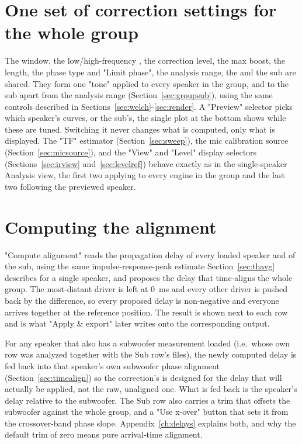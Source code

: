 \section{One set of correction settings for the whole group}
The  window, the low/high-frequency , the correction level, the max boost, the  length, the phase type and "Limit phase", the analysis range, the  and the sub  are shared. They form one "tone" applied to every speaker in the group, and to the sub apart from the analysis range (Section~\ref{sec:groupsub}), using the same controls described in Sections~\ref{sec:welch}-\ref{sec:render}. A "Preview" selector picks which speaker's curves, or the sub's, the single plot at the bottom shows while these are tuned. Switching it never changes what is computed, only what is displayed. The "TF" estimator (Section~\ref{sec:sweep}), the mic calibration source (Section~\ref{sec:micsource}), and the "View" and "Level" display selectors (Sections~\ref{sec:irview} and~\ref{sec:levelref}) behave exactly as in the single-speaker Analysis view, the first two applying to every engine in the group and the last two following the previewed speaker.

\section{Computing the alignment}\label{sec:groupalign}
"Compute alignment" reads the propagation delay of every loaded speaker and of the sub, using the same impulse-response-peak estimate Section~\ref{sec:thavg} describes for a single speaker, and proposes the delay that time-aligns the whole group. The most-distant driver is left at \SI{0}{ms} and every other driver is pushed back by the difference, so every proposed delay is non-negative and everyone arrives together at the reference position. The result is shown next to each row and is what "Apply \& export" later writes onto the corresponding output.

For any speaker that also has a subwoofer measurement loaded (i.e.\ whose own row was analyzed together with the Sub row's files), the newly computed delay is fed back into that speaker's own subwoofer phase alignment (Section~\ref{sec:timealign}) so the correction's   is designed for the delay that will actually be applied, not the raw, unaligned one. What is fed back is the speaker's delay relative to the subwoofer. The Sub row also carries a trim that offsets the subwoofer against the whole group, and a "Use x-over" button that sets it from the crossover-band phase slope. Appendix~\ref{ch:delays} explains both, and why the default trim of zero means pure arrival-time alignment.

